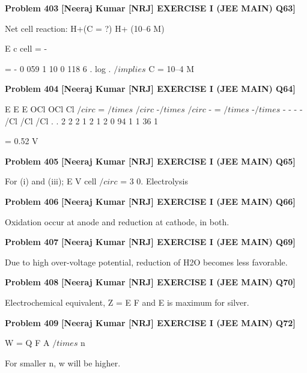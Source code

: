 \begin{problembox}
\textbf{Problem 403} \hfill \textbf{[Neeraj Kumar [NRJ] EXERCISE I (JEE MAIN) Q63]}
\label{q:ext-nrj_all_questions-403}

Net cell reaction: H+(C = ?) 
 H+ (10--6 M)
 
 
E
c
cell = -
 
=
-
0 059
1
10
0 118
6
.
log
.
 $/implies$ C = 10--4 M
\end{problembox}

\begin{problembox}
\textbf{Problem 404} \hfill \textbf{[Neeraj Kumar [NRJ] EXERCISE I (JEE MAIN) Q64]}
\label{q:ext-nrj_all_questions-404}

E
E
E
OCl
OCl
Cl
$/circ$
=
$/times$
$/circ$
-$/times$
$/circ$
-
=
$/times$
-$/times$
-
-
-
-
/Cl
/Cl
/Cl
.
.
2
2
2
1
2
1
2
0 94
1 1 36
1
 
                   = 0.52 V
\end{problembox}

\begin{problembox}
\textbf{Problem 405} \hfill \textbf{[Neeraj Kumar [NRJ] EXERCISE I (JEE MAIN) Q65]}
\label{q:ext-nrj_all_questions-405}

For (i)  and  (iii); E
V
cell
$/circ$
= 3 0.
Electrolysis
\end{problembox}

\begin{problembox}
\textbf{Problem 406} \hfill \textbf{[Neeraj Kumar [NRJ] EXERCISE I (JEE MAIN) Q66]}
\label{q:ext-nrj_all_questions-406}

Oxidation occur at anode and reduction at 
cathode, in both.
\end{problembox}

\begin{problembox}
\textbf{Problem 407} \hfill \textbf{[Neeraj Kumar [NRJ] EXERCISE I (JEE MAIN) Q69]}
\label{q:ext-nrj_all_questions-407}

Due to high over-voltage potential, reduction of 
H2O becomes less favorable.
\end{problembox}

\begin{problembox}
\textbf{Problem 408} \hfill \textbf{[Neeraj Kumar [NRJ] EXERCISE I (JEE MAIN) Q70]}
\label{q:ext-nrj_all_questions-408}

Electrochemical equivalent, Z = E
F and E is 
maximum for silver.
\end{problembox}

\begin{problembox}
\textbf{Problem 409} \hfill \textbf{[Neeraj Kumar [NRJ] EXERCISE I (JEE MAIN) Q72]}
\label{q:ext-nrj_all_questions-409}

W = Q
F
A
$/times$ n
 
 For smaller n, w will be higher.
\end{problembox}


